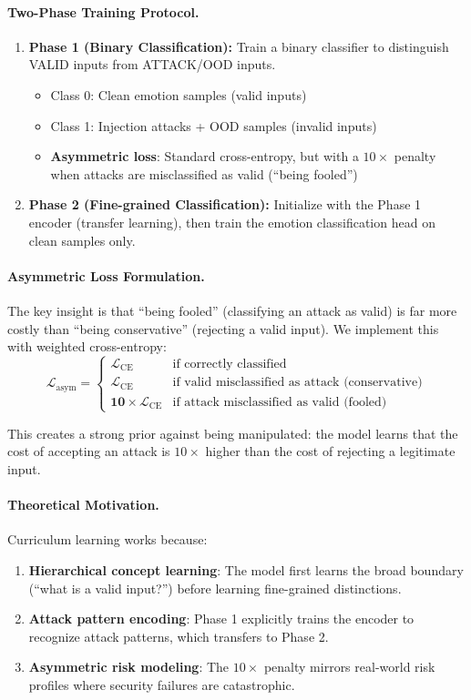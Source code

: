 \documentclass[11pt]{article}
\begin{document}
\paragraph{Two-Phase Training Protocol.}
\begin{enumerate}[leftmargin=*]
  \item \textbf{Phase 1 (Binary Classification):} Train a binary classifier to distinguish VALID inputs from ATTACK/OOD inputs.
  \begin{itemize}
    \item Class 0: Clean emotion samples (valid inputs)
    \item Class 1: Injection attacks + OOD samples (invalid inputs)
    \item \textbf{Asymmetric loss}: Standard cross-entropy, but with a $10\times$ penalty when attacks are misclassified as valid (``being fooled'')
  \end{itemize}
  \item \textbf{Phase 2 (Fine-grained Classification):} Initialize with the Phase 1 encoder (transfer learning), then train the emotion classification head on clean samples only.
\end{enumerate}

\paragraph{Asymmetric Loss Formulation.}
The key insight is that ``being fooled'' (classifying an attack as valid) is far more costly than ``being conservative'' (rejecting a valid input).
We implement this with weighted cross-entropy:
\[
\mathcal{L}_{\text{asym}} = \begin{cases}
\mathcal{L}_{\text{CE}} & \text{if correctly classified} \\
\mathcal{L}_{\text{CE}} & \text{if valid misclassified as attack (conservative)} \\
\mathbf{10} \times \mathcal{L}_{\text{CE}} & \text{if attack misclassified as valid (fooled)}
\end{cases}
\]

This creates a strong prior against being manipulated: the model learns that the cost of accepting an attack is $10\times$ higher than the cost of rejecting a legitimate input.

\paragraph{Theoretical Motivation.}
Curriculum learning works because:
\begin{enumerate}[leftmargin=*]
  \item \textbf{Hierarchical concept learning}: The model first learns the broad boundary (``what is a valid input?'') before learning fine-grained distinctions.
  \item \textbf{Attack pattern encoding}: Phase 1 explicitly trains the encoder to recognize attack patterns, which transfers to Phase 2.
  \item \textbf{Asymmetric risk modeling}: The $10\times$ penalty mirrors real-world risk profiles where security failures are catastrophic.
\end{enumerate}
\end{document}
